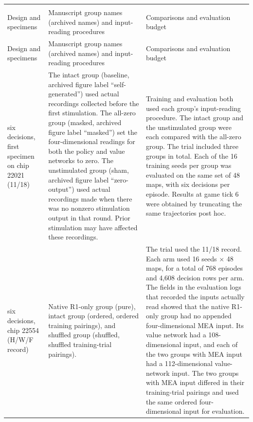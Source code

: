 \documentclass{article}
\begin{document}
\begingroup\small\setlength{\tabcolsep}{3pt}
\begin{longtable}{>{\raggedright\arraybackslash}p{}>{\raggedright\arraybackslash}p{}>{\raggedright\arraybackslash}p{}}
\multicolumn{3}{@{}p{\linewidth}@{}}{\raggedright\normalsize Replay groups and pairing budgets for each experiment} \\* [3pt]
\toprule
Design and specimens & Manuscript group names (archived names) and input-reading procedures & Comparisons and evaluation budget \\
\midrule\endfirsthead
\toprule
Design and specimens & Manuscript group names (archived names) and input-reading procedures & Comparisons and evaluation budget \\
\midrule\endhead
\bottomrule\endfoot
six decisions, first specimen on chip 22021 (11/18) & The intact group (baseline, archived figure label “self-generated”) used actual recordings collected before the first stimulation. The all-zero group (masked, archived figure label “masked”) set the four-dimensional readings for both the policy and value networks to zero. The unstimulated group (sham, archived figure label “zero-output”) used actual recordings made when there was no nonzero stimulation output in that round. Prior stimulation may have affected these recordings. & Training and evaluation both used each group’s input-reading procedure. The intact group and the unstimulated group were each compared with the all-zero group. The trial included three groups in total. Each of the 16 training seeds per group was evaluated on the same set of 48 maps, with six decisions per episode. Results at game tick 6 were obtained by truncating the same trajectories post hoc. \\
six decisions, chip 22554 (H/W/F record) & Native R1-only group (pure), intact group (ordered, ordered training pairings), and shuffled group (shuffled, shuffled training-trial pairings). & The trial used the 11/18 record. Each arm used 16 seeds \ensuremath{\times} 48 maps, for a total of 768 episodes and 4,608 decision rows per arm. The fields in the evaluation logs that recorded the inputs actually read showed that the native R1-only group had no appended four-dimensional MEA input. Its value network had a 108-dimensional input, and each of the two groups with MEA input had a 112-dimensional value-network input. The two groups with MEA input differed in their training-trial pairings and used the same ordered four-dimensional input for evaluation. \\

\end{longtable}
\end{document}
